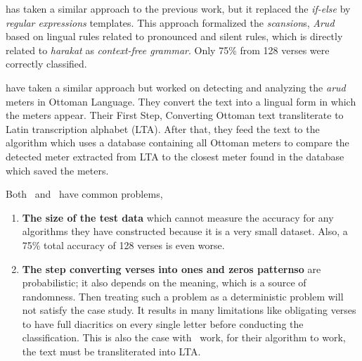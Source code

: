 \cite{Alnagdawi2013FindingArabicPoemMeter} has taken a similar approach to the previous work, but it replaced the \textit{if-else} by \textit{regular expressions} templates. This approach formalized the \textit{scansion}s, \textit{Arud} based on lingual rules related to pronounced and silent rules, which is directly related to \textit{harakat} as \textit{context-free grammar}. Only 75\% from 128 verses were correctly classified. 

\cite{Kurt2012AlgorithmForDetectionAnalysis} have taken a similar approach but worked on detecting and analyzing the \textit{arud} meters in Ottoman Language. They convert the text into a lingual form in which the meters appear. Their First Step, Converting Ottoman text transliterate to Latin transcription alphabet (LTA). After that, they feed the text to the algorithm which uses a database containing all Ottoman meters to compare the detected meter extracted from LTA to the closest meter found in the database which saved the meters.

Both~\cite{Abuata2016RuleBasedAlgorithmFor} and~\cite{Alnagdawi2013FindingArabicPoemMeter} have common problems,

\begin{enumerate}
\item \textbf{The size of the test data} which cannot measure the accuracy for any algorithms they have constructed because it is a very small dataset. Also, a 75\% total accuracy of 128 verses is even worse.
  \item \textbf{The step converting verses into ones and zeros patternso} are probabilistic; it also depends on the meaning, which is a source of randomness. Then treating such a problem as a deterministic problem will not satisfy the case study. It results in many limitations like obligating verses to have full diacritics on every single letter before conducting the classification. This is also the case with~\cite{Kurt2012AlgorithmForDetectionAnalysis} work, for their algorithm to work, the text must be transliterated into LTA.
  \end{enumerate}



